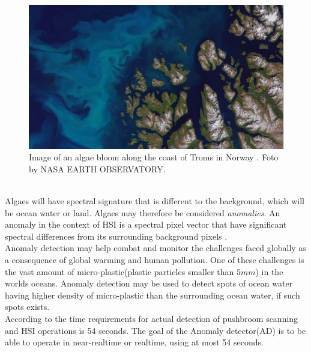 \begin{figure}[H]
\centering
   \includegraphics[scale=0.3]{images/algaes/algaes_northern_troms.jpg}
  \caption{ Image of an algae bloom along the coast of Troms in Norway \cite{laksedeath}. Foto by NASA EARTH OBSERVATORY. } 
  \label{fig:algae_bloom_troms}
\end{figure}
\\

Algaes will have spectral signature that is different to the background, which will be ocean water or land. Algaes may therefore be considered \textit{anomalies}. An anomaly in the context of HSI is a spectral pixel vector that have significant spectral differences from its surrounding background pixels \cite{yang2015dual}.  
\\

Anomaly detection may help combat and monitor the challenges faced globally as a consequence of global warming and human pollution. One of these challenges is the vast amount of micro-plastic(plastic particles smaller than $5mm$) in the worlds oceans. Anomaly detection may be used to detect spots of ocean water having higher density of micro-plastic than the surrounding ocean water, if such spots exists.       \\



According to \cite{SmallSat_project_description} the time requirements for actual detection of pushbroom scanning and HSI operations is 54 seconds. The goal of the Anomaly detector(AD) is to be able to operate in near-realtime or realtime, using at most 54 seconds. 

\\





